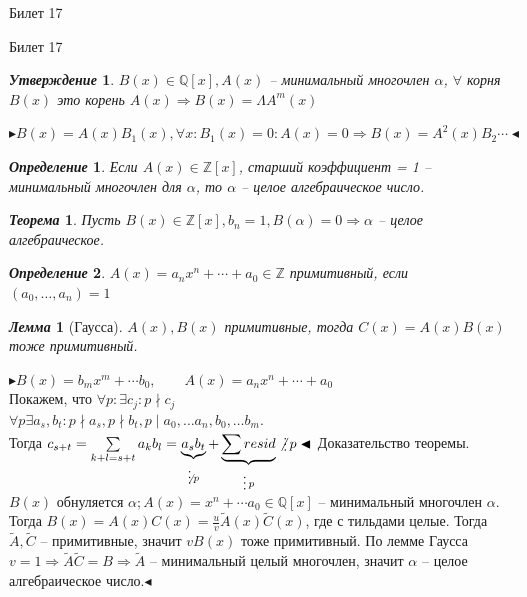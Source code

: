\documentclass[a4paper,12pt]{article}
\newcommand{\divisible}{\mathop{\raisebox{-2pt}{\vdots}}}
\newtheorem{deff}{\textit{Определение}}
\newtheorem{teo}{\textit{Теорема}}
\newtheorem{utv}{\textit{Утверждение}}
\newtheorem{lem}{\textit{Лемма}}
\newcommand{\AL}{\alpha}
\newcommand{\q}{\quad}
\newcommand{\pb}{\blacktriangleright}
\newcommand{\pe}{\blacktriangleleft}
\newcommand{\Ra}{\Rightarrow}
\newcommand{\bb}[1]{\mathbb{#1}}
\newcommand{\SL}{\sum\limits}
\begin{document}
\begin{mybox}{\hypertarget{bil17}{Билет 17}}
\end{mybox}
\newpage
\begin{mybox}{{Билет 17}}
\begin{formbox}{}
\begin{utv} $B(x) \in \bb{Q}[x], A(x) $ -- минимальный многочлен $\AL$, $\forall$ корня $B(x)$ это корень $A(x)\Ra B(x) = \Lambda  A^m(x)$
\end{utv}
\end{formbox}
$\pb B(x) = A(x)B_1(x), \forall x: B_1(x) = 0: A(x) = 0 \Ra B(x) = A^2(x)B_2 \cdots \pe$


\begin{formbox}{}
\begin{deff} Если $A(x)\in\bb{Z}[x]$, старший коэффициент = 1 -- минимальный многочлен для $\AL$, то $\AL$ -- целое алгебраическое число.
\end{deff}
\end{formbox}
\begin{formbox}{}
\begin{teo} Пусть $B(x) \in \bb{Z}[x], b_n = 1, B(\AL) = 0 \Ra \AL$ -- целое алгебраическое.
\end{teo}
\end{formbox}
\begin{formbox}{}
\begin{deff} $A(x) = a_nx^n + \cdots + a_0\in\bb{Z}$ примитивный, если $(a_0,\dots,a_n) = 1$
\end{deff}
\end{formbox}
\begin{formbox}{}
\begin{lem}[Гаусса] $A(x),B(x)$ примитивные, тогда $C(x) = A(x)B(x)$ тоже примитивный.
\end{lem}
\end{formbox}
$\pb B(x) = b_mx^m + \cdots b_0,\q\q A(x) = a_nx^n+\cdots +a_0$\\
Покажем, что $\forall p: \exists c_j: p\nmid c_j$\\
$\forall p \exists a_s, b_t: p\nmid a_s, p\nmid b_t, p\mid a_0, \dots a_n, b_0,\dots b_m$.\\
Тогда $c_{s+t} = \SL_{k+l = s+t} a_kb_l = \underbrace{a_sb_t}_{\not\divisible p} + \underbrace{\SL resid}_{\divisible p} \not\divisible p\pe$
Доказательство теоремы.\\
$B(x)$ обнуляется $\AL; A(x) = x^n + \cdots a_0 \in\bb{Q}[x]$ -- минимальный многочлен $\AL$. Тогда $B(x) = A(x)C(x) = \frac{u}{v} \tilde{A}(x)\tilde{C}(x) $, где с тильдами целые. Тогда $\tilde{A}, \tilde{C}$ -- примитивные, значит $vB(x)$ тоже примитивный. По лемме Гаусса $v = 1\Ra \tilde{A}\tilde{C} = B\Ra \tilde{A}$ -- минимальный целый многочлен, значит $\AL$ -- целое алгебраическое число.$\pe$

\end{mybox}
\end{document}
